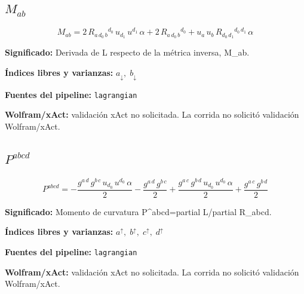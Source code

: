 \documentclass[11pt]{article}
\begin{document}
\subsection*{$ M_{ab} $}
\begin{dmath*}[breakdepth={5}]
M_{ab} = 2\,R{}_{a\,d_{0}\,b}{}^{d_{0}}\,u{}_{d_{1}}\,u{}^{d_{1}}\,\alpha + 2\,R{}_{a\,d_{0}\,b}{}^{d_{0}} + u{}_{a}\,u{}_{b}\,R{}_{d_{0}\,d_{1}}{}^{d_{0}\,d_{1}}\,\alpha
\end{dmath*}
\par\vspace{1.2\baselineskip}\noindent
\begin{minipage}{\linewidth}
\textbf{Significado:} Derivada de L respecto de la métrica inversa, M\_ab.\par
\textbf{Índices libres y varianzas:} $ a_{\downarrow},\;b_{\downarrow} $\par
\textbf{Fuentes del pipeline:} \texttt{lagrangian}\par
\textbf{Wolfram/xAct:} validación xAct no solicitada. La corrida no solicitó validación Wolfram/xAct.\par
\end{minipage}
\subsection*{$ P^{abcd} $}
\begin{dmath*}[breakdepth={5}]
P^{abcd} = -\frac{g{}^{a\,d}\,g{}^{b\,c}\,u{}_{d_{0}}\,u{}^{d_{0}}\,\alpha}{2} - \frac{g{}^{a\,d}\,g{}^{b\,c}}{2} + \frac{g{}^{a\,c}\,g{}^{b\,d}\,u{}_{d_{0}}\,u{}^{d_{0}}\,\alpha}{2} + \frac{g{}^{a\,c}\,g{}^{b\,d}}{2}
\end{dmath*}
\par\vspace{1.2\baselineskip}\noindent
\begin{minipage}{\linewidth}
\textbf{Significado:} Momento de curvatura P^{abcd}=partial L/partial R\_abcd.\par
\textbf{Índices libres y varianzas:} $ a^{\uparrow},\;b^{\uparrow},\;c^{\uparrow},\;d^{\uparrow} $\par
\textbf{Fuentes del pipeline:} \texttt{lagrangian}\par
\textbf{Wolfram/xAct:} validación xAct no solicitada. La corrida no solicitó validación Wolfram/xAct.\par
\end{minipage}
\end{document}
